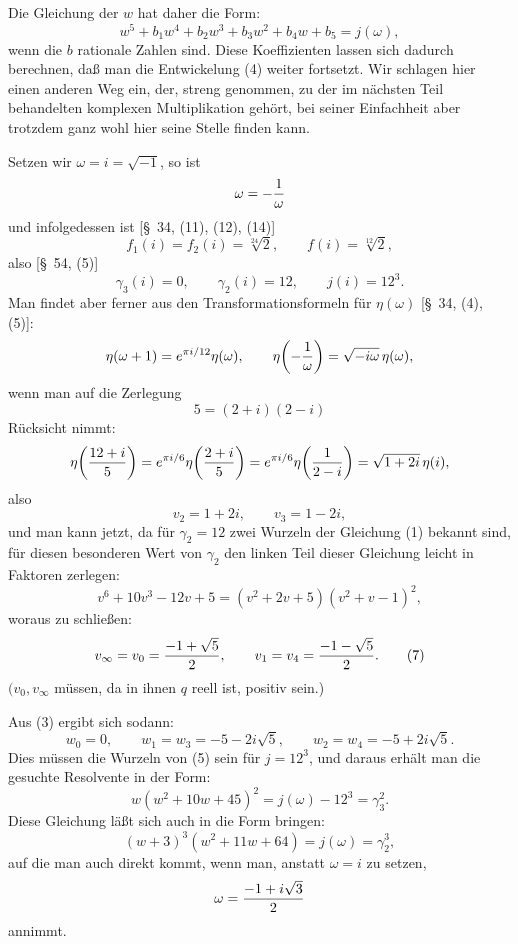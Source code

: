 \documentclass[11pt]{article}
\begin{document}
Die Gleichung der \(w\) hat daher die Form:
\begin{equation}
 w^5+b_1w^4+b_2w^3+b_3w^2+b_4w+b_5=j(\omega),
\tag{5}
\end{equation}
wenn die \(b\) rationale Zahlen sind. Diese Koeffizienten lassen sich dadurch berechnen, daß man die Entwickelung (4) weiter fortsetzt. Wir schlagen hier einen anderen Weg ein, der, streng genommen, zu der im nächsten Teil behandelten komplexen Multiplikation gehört, bei seiner Einfachheit aber trotzdem ganz wohl hier seine Stelle finden kann.

Setzen wir \(\omega=i=\sqrt{-1}\), so ist
\[
 \omega=-{1\over\omega}
\]
und infolgedessen ist [\S~34, (11), (12), (14)]
\[
 f_1(i)=f_2(i)=\sqrt[24]{2},\qquad f(i)=\sqrt[12]{2},
\]
also [\S~54, (5)]
\begin{equation}
 \gamma_3(i)=0,\qquad \gamma_2(i)=12,\qquad j(i)=12^3.
\tag{6}
\end{equation}
Man findet aber ferner aus den Transformationsformeln für \(\eta(\omega)\) [\S~34, (4), (5)]:
\[
 \eta(\omega+1)=e^{\pi i/12}\eta(\omega),
 \qquad
 \eta\!\left(-{1\over\omega}\right)=\sqrt{-i\omega}\,\eta(\omega),
\]
wenn man auf die Zerlegung
\[
5=(2+i)(2-i)
\]
Rücksicht nimmt:
\[
 \eta\!\left({12+i\over5}\right)
 =e^{\pi i/6}\eta\!\left({2+i\over5}\right)
 =e^{\pi i/6}\eta\!\left({1\over2-i}\right)
 =\sqrt{1+2i}\,\eta(i),
\]
also
\[
 v_2=1+2i,\qquad v_3=1-2i,
\]
und man kann jetzt, da für \(\gamma_2=12\) zwei Wurzeln der Gleichung (1) bekannt sind, für diesen besonderen Wert von \(\gamma_2\) den linken Teil dieser Gleichung leicht in Faktoren zerlegen:
\[
 v^6+10v^3-12v+5=(v^2+2v+5)(v^2+v-1)^2,
\]
woraus zu schließen:
\begin{equation}
 v_\infty=v_0={-1+\sqrt5\over2},\qquad
 v_1=v_4={-1-\sqrt5\over2}.
\tag{7}
\end{equation}
\((v_0,v_\infty\) müssen, da in ihnen \(q\) reell ist, positiv sein.)

Aus (3) ergibt sich sodann:
\begin{equation}
 w_0=0,\qquad
 w_1=w_3=-5-2i\sqrt5,\qquad
 w_2=w_4=-5+2i\sqrt5.
\tag{8}
\end{equation}
Dies müssen die Wurzeln von (5) sein für \(j=12^3\), und daraus erhält man die gesuchte Resolvente in der Form:
\begin{equation}
 w(w^2+10w+45)^2=j(\omega)-12^3=\gamma_3^2.
\tag{9}
\end{equation}
Diese Gleichung läßt sich auch in die Form bringen:
\begin{equation}
 (w+3)^3(w^2+11w+64)=j(\omega)=\gamma_2^3,
\tag{10}
\end{equation}
auf die man auch direkt kommt, wenn man, anstatt \(\omega=i\) zu setzen,
\[
 \omega={-1+i\sqrt3\over2}
\]
annimmt.
\end{document}
